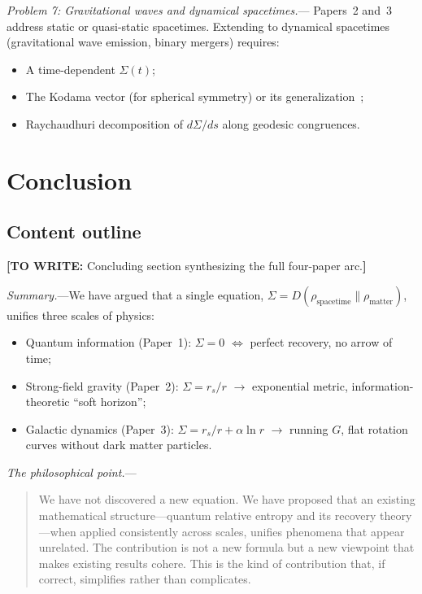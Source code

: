 \documentclass[prl,twocolumn,superscriptaddress,longbibliography,floatfix]{revtex4-2}
\newcommand{\towrite}[1]{{\color{blue}\textbf{[TO WRITE:} #1\textbf{]}}}
\begin{document}
\emph{Problem 7: Gravitational waves and dynamical spacetimes.}---
Papers~2 and~3 address static or quasi-static spacetimes.
Extending to dynamical spacetimes (gravitational wave emission,
binary mergers) requires:
\begin{itemize}
\item A time-dependent $\Sigma(t)$;
\item The Kodama vector (for spherical symmetry) or its
  generalization~\cite{DorauVerch2024};
\item Raychaudhuri decomposition of $d\Sigma/ds$ along
  geodesic congruences.
\end{itemize}

\section{Conclusion}
\label{sec:conclusion}

\subsection*{Content outline}

\towrite{Concluding section synthesizing the full four-paper arc.}

\emph{Summary.}---We have argued that a single equation,
$\Sigma = D(\rho_{\mathrm{spacetime}} \| \rho_{\mathrm{matter}})$,
unifies three scales of physics:
\begin{itemize}
\item Quantum information (Paper~1): $\Sigma = 0$
  $\Leftrightarrow$ perfect recovery, no arrow of time;
\item Strong-field gravity (Paper~2): $\Sigma = r_s/r$
  $\to$ exponential metric, information-theoretic ``soft horizon'';
\item Galactic dynamics (Paper~3): $\Sigma = r_s/r + \alpha\ln r$
  $\to$ running $G$, flat rotation curves without dark matter
  particles.
\end{itemize}

\emph{The philosophical point.}---
\begin{quote}
We have not discovered a new equation. We have proposed that an
existing mathematical structure---quantum relative entropy and
its recovery theory---when applied consistently across scales,
unifies phenomena that appear unrelated. The contribution is not
a new formula but a new viewpoint that makes existing results
cohere. This is the kind of contribution that, if correct,
simplifies rather than complicates.
\end{quote}
\end{document}
